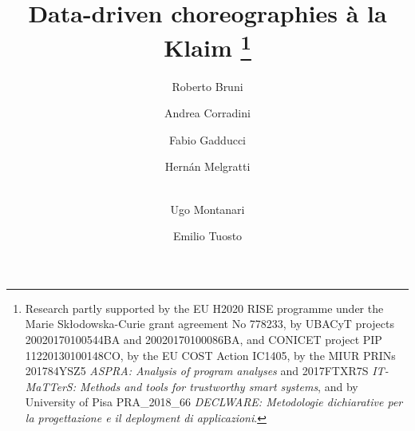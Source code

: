 \documentclass[runningheads,a4paper]{llncs}
\begin{document}
\mainmatter  %

\title{
  \iffinal
  Data-driven choreographies \`a la Klaim
  \else
  \fi
  \thanks{\scriptsize
    Research partly supported by
    the EU H2020 RISE programme under the Marie Skłodowska-Curie grant agreement No 778233,
    by UBACyT projects 20020170100544BA and 20020170100086BA,
    and CONICET project PIP 11220130100148CO,
    by the EU COST Action IC1405,
    by the MIUR PRINs 201784YSZ5 \emph{ASPRA: Analysis of program analyses} and
    2017FTXR7S \emph{IT-MaTTerS: Methods and tools for trustworthy smart systems},
    and
    by University of Pisa PRA\_2018\_66  \emph{DECLWARE: Metodologie
      dichiarative per la progettazione e il deployment di applicazioni}.
  }
}


%
%

\author{
  Roberto Bruni  \and
  Andrea Corradini  \and
  Fabio Gadducci  \and
  Hern\'an Melgratti  \and
  \\
  Ugo Montanari  \and
  Emilio Tuosto
}

\iffinal
{}
\else
{}
\fi

\maketitle
\end{document}
